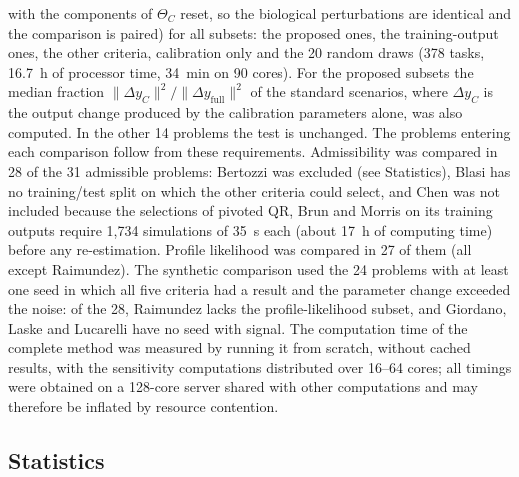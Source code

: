 \documentclass[pdflatex,sn-nature]{sn-jnl}
\theoremstyle{plain}
\begin{document}
with the components of $\Theta_C$ reset, so the biological perturbations are identical and the comparison is paired) for all subsets: the proposed ones, the training-output ones, the other criteria, calibration only and the 20 random draws (378 tasks, 16.7~h of processor time, 34~min on 90 cores). For the proposed subsets the median fraction $\|\Delta y_C\|^2/\|\Delta y_{\mathrm{full}}\|^2$ of the standard scenarios, where $\Delta y_C$ is the output change produced by the calibration parameters alone, was also computed. In the other 14 problems the test is unchanged. The problems entering each comparison follow from these requirements. Admissibility was compared in 28 of the 31 admissible problems: Bertozzi was excluded (see Statistics), Blasi has no training/test split on which the other criteria could select, and Chen was not included because the selections of pivoted QR, Brun and Morris on its training outputs require 1,734 simulations of 35~s each (about 17~h of computing time) before any re-estimation. Profile likelihood was compared in 27 of them (all except Raimundez). The synthetic comparison used the 24 problems with at least one seed in which all five criteria had a result and the parameter change exceeded the noise: of the 28, Raimundez lacks the profile-likelihood subset, and Giordano, Laske and Lucarelli have no seed with signal. The computation time of the complete method was measured by running it from scratch, without cached results, with the sensitivity computations distributed over 16--64 cores; all timings were obtained on a 128-core server shared with other computations and may therefore be inflated by resource contention.

\subsection*{Statistics}\label{met:stats}
\end{document}
